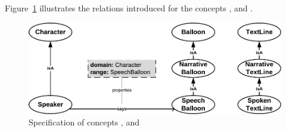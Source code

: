 Figure~\ref{fig:model_d_3} illustrates the relations introduced for the concepts ,  and .

\begin{figure}[h!]
\begin{center}
\includegraphics[width=1\textwidth]{model_step2ter_new.pdf}
\caption{Specification of concepts ,  and }
\label{fig:model_d_3}
\end{center}
\end{figure}






